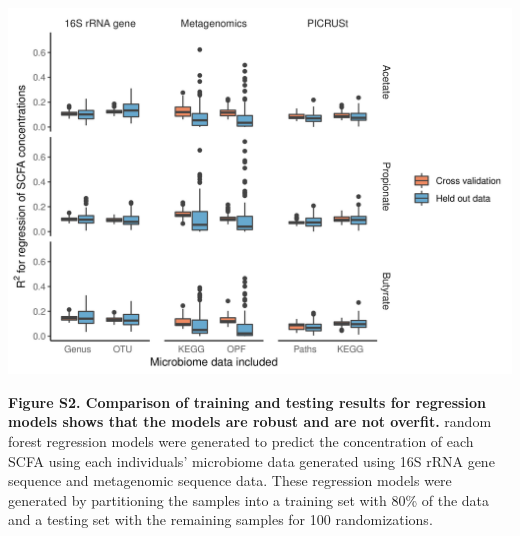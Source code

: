 \documentclass[11pt,]{article}
\begin{document}
\includegraphics{figure_s2.png}

\textbf{Figure S2. Comparison of training and testing results for
regression models shows that the models are robust and are not overfit.}
random forest regression models were generated to predict the
concentration of each SCFA using each individuals' microbiome data
generated using 16S rRNA gene sequence and metagenomic sequence data.
These regression models were generated by partitioning the samples into
a training set with 80\% of the data and a testing set with the
remaining samples for 100 randomizations.
\end{document}
